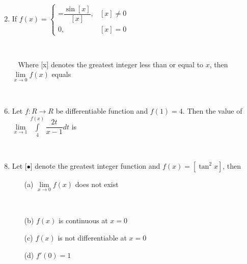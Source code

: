 \documentclass[journal,12pt,twocolumn]{IEEEtran}
\begin{document}
\begin{enumerate}
\item[~] \item If $f(x)=\begin{cases}\mathbin{=}\dfrac{\sin[x]}{[x]}, & \text{$[x]\neq 0$} \\
0, & \text{$[x]=0$} \end{cases}$\item[~] \item[~]
Where [x] denotes the greatest integer less than or equal to $x$, then $\lim\limits_{x \to 0}f(x)$ equals
\begin{itemize}
\end{itemize}

\item[~] \item Let $f:R\to R$ be differentiable function and $f(1)=4$. Then the value of $\lim\limits_{x \to 1}\int\limits_4^{f(x)}\dfrac{2t}{x-1} dt$ is
\begin{itemize}
\end{itemize}

\item[~] \item Let [$\bullet$] denote the greatest integer function and $f(x)=[\tan^2x]$, then
\begin{itemize}
\item[(a)] $\lim\limits_{x \to 0}f(x)$ does not exist \item[~]
\item[(b)] $f(x)$ is continuous at $x=0$
\item[(c)] $f(x)$ is not differentiable at $x=0$
\item[(d)] $f'(0)=1$
\end{itemize}


\end{enumerate}
\end{document}
